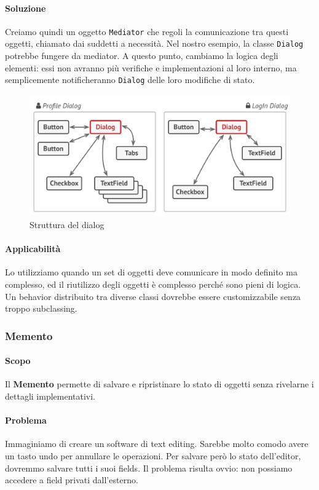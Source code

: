 \documentclass[11pt]{article}
\newcommand{\code}[1]{\texttt{#1}}
\begin{document}
\paragraph{Soluzione}
Creiamo quindi un oggetto \code{Mediator} che regoli la comunicazione tra questi oggetti, chiamato dai suddetti a necessità. Nel nostro esempio, la classe \code{Dialog} potrebbe fungere da mediator. A questo punto, cambiamo la logica degli elementi: essi non avranno più verifiche e implementazioni al loro interno, ma semplicemente notificheranno \code{Dialog} delle loro modifiche di stato. 
\begin{figure}[H]
    \includegraphics[width=\linewidth]{res/teoria/Mediator.png}
    \caption{Struttura del dialog}
\end{figure}
\paragraph{Applicabilità}
Lo utilizziamo quando un set di oggetti deve comunicare in modo definito ma complesso, ed il riutilizzo degli oggetti è complesso perché sono pieni di logica. Un behavior distribuito tra diverse classi dovrebbe essere customizzabile senza troppo subclassing. 

\subsubsection{Memento}
\paragraph{Scopo}
Il \textbf{Memento} permette di salvare e ripristinare lo stato di oggetti senza rivelarne i dettagli implementativi. 
\paragraph{Problema}
Immaginiamo di creare un software di text editing. Sarebbe molto comodo avere un tasto undo per annullare le operazioni. Per salvare però lo stato dell'editor, dovremmo salvare tutti i suoi fields. Il problema risulta ovvio: non possiamo accedere a field privati dall'esterno. 
\end{document}
